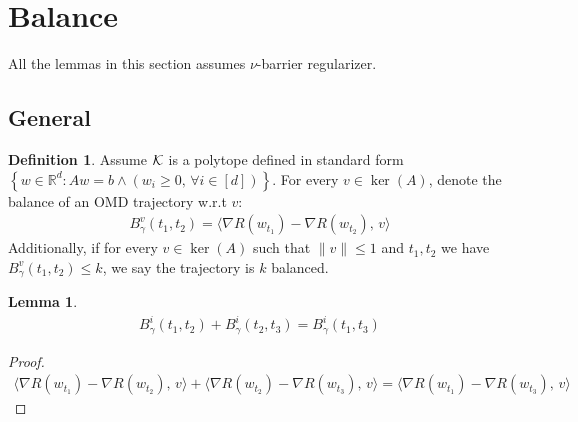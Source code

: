 \documentclass[10pt]{article}
\newtheorem{lemma}[theorem]{Lemma}
\theoremstyle{definition}
\newtheorem{definition}[theorem]{Definition}
\theoremstyle{remark}
\newcommand{\rr}{\mathbb{R}}
\newcommand\inprod[2]{\langle #1,\,#2 \rangle}
\newcommand{\curly}[1]{ {\left\{ #1 \right\}}}
\newcommand{\roundy}[1]{ {\left( #1 \right)}}
\begin{document}
\section{Balance}\label{apx:balance}
All the lemmas in this section assumes $\nu$-barrier regularizer.
\subsection{General}





\begin{definition}
Assume $\mathcal K$ is a polytope defined in standard form $\curly{w \in \rr^d: Aw=b\land \roundy{w_i\ge 0,\,\forall i\in[d]}}$. For every $v\in \ker(A)$, denote the balance of an OMD trajectory w.r.t $v$:
\begin{align*}
    B^v_\gamma(t_1,t_2) = \inprod{\nabla R(w_{t_1}) - \nabla R(w_{t_2})}{v}
\end{align*}
Additionally, if for every $v\in \ker(A)$ such that $\|v\|\le 1$ and $t_1,t_2$ we have $B^v_\gamma(t_1,t_2) \le k$, we say the trajectory is $k$ balanced.
\end{definition}

\begin{lemma} \label{lem:balance trasitive}
\begin{align*}
    B_\gamma^i(t_1,t_2) + B_\gamma^i(t_2, t_3) = B_\gamma^i(t_1,t_3)
\end{align*}
\end{lemma}
\begin{proof}
\begin{align*}
    \inprod{\nabla R(w_{t_1}) - \nabla R(w_{t_2})}{v} + \inprod{\nabla R(w_{t_2}) - \nabla R(w_{t_3})}{v} = \inprod{\nabla R(w_{t_1}) - \nabla R(w_{t_3})}{v}
\end{align*}
\end{proof}
\end{document}
